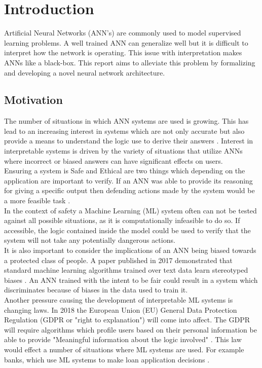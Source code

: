 \chapter{Introduction}\label{C:intro}

Artificial Neural Networks (ANN's) are commonly used to model supervised learning problems. A well trained ANN can generalize well but it is difficult to interpret how the network is operating. This issue with interpretation makes ANNs like a black-box. This report aims to alleviate this problem by formalizing and developing a novel neural network architecture.

\section{Motivation}
The number of situations in which ANN systems are used is growing. This has lead to an increasing interest in systems which are not only accurate but also provide a means to understand the logic use to derive their answers \cite{doshi2017towards}. Interest in interpretable systems is driven by the variety of situations that utilize ANNs where incorrect or biased answers can have significant effects on users.\\

Ensuring a system is Safe and Ethical are two things which depending on the application are important to verify. If an ANN was able to provide its reasoning for giving a specific output then defending actions made by the system would be a more feasible task \cite{doshi2017towards}.\\

In the context of safety a Machine Learning (ML) system often can not be tested against all possible situations, as it is computationally infeasible to do so. If accessible, the logic contained inside the model could be used to verify that the system will not take any potentially dangerous actions.\\

It is also important to consider the implications of an ANN being biased towards a protected class of people. A paper published in 2017 demonstrated that standard machine learning algorithms trained over text data learn stereotyped biases \cite{caliskan2017semantics}. An ANN trained with the intent to be fair could result in a system which discriminates because of biases in the data used to train it.\\

Another pressure causing the development of interpretable ML systems is changing laws. In 2018 the European Union (EU) General Data Protection Regulation (GDPR or "right to explanation") will come into affect. The GDPR will require algorithms which profile users based on their personal information be able to provide "Meaningful information about the logic involved"  \cite{eu-dgpr}. This law would effect a number of situations where ML systems are used. For example banks, which use ML systems to make loan application decisions \cite{goodman2016european}.\\

